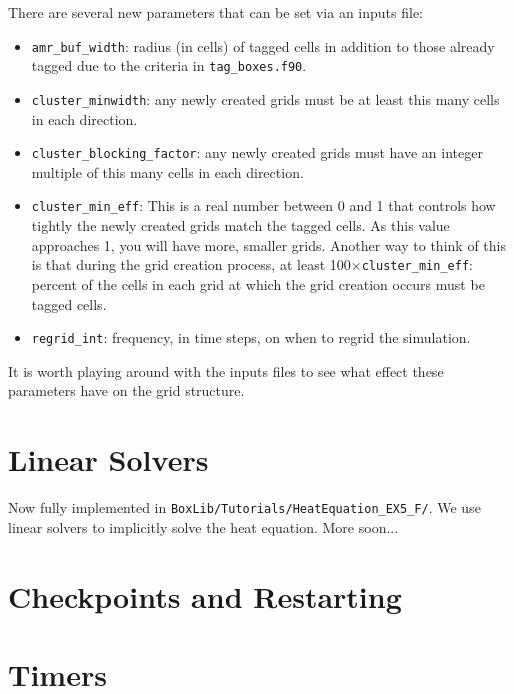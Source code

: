 There are several new
parameters that can be set via an inputs file:
\begin{itemize}
\item {\tt amr\_buf\_width}: radius (in cells) of tagged cells in addition to those already tagged due to the criteria in {\tt tag\_boxes.f90}.
\item {\tt cluster\_minwidth}: any newly created grids must be at least this many cells in each direction.
\item {\tt cluster\_blocking\_factor}: any newly created grids must have an integer multiple of this many cells in each direction.
\item {\tt cluster\_min\_eff}: This is a real number between 0 and 1 that controls how tightly the newly created grids match the tagged cells.  As this value approaches 1, you will have more, smaller grids.  Another way to think of this is that during the grid creation process, at least 100$\times${\tt cluster\_min\_eff}: percent of the cells in each grid at which the grid creation occurs must be tagged cells.
\item {\tt regrid\_int}: frequency, in time steps, on when to regrid the simulation.
\end{itemize}
It is worth playing around with the inputs files to see what effect these parameters have on the grid structure.

\section{Linear Solvers}\label{Sec:Linear Solvers}
Now fully implemented in {\tt BoxLib/Tutorials/HeatEquation\_EX5\_F/}.  We use linear solvers
to implicitly solve the heat equation.  More soon...

\section{Checkpoints and Restarting}\label{Sec:Checkpoints}
\section{Timers}\label{Sec:Timers}


